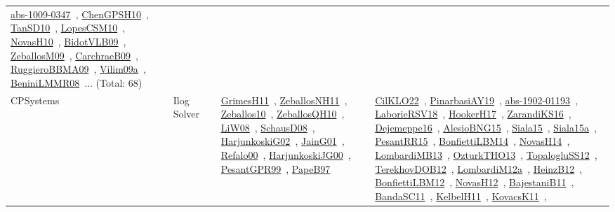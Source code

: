 {\begin{longtable}{lp{3cm}>{\raggedright\arraybackslash}p{6cm}>{\raggedright\arraybackslash}p{6cm}>{\raggedright\arraybackslash}p{8cm}}
\href{../works/abs-1009-0347.pdf}{abs-1009-0347}~\cite{abs-1009-0347}, \href{../works/ChenGPSH10.pdf}{ChenGPSH10}~\cite{ChenGPSH10}, \href{../works/TanSD10.pdf}{TanSD10}~\cite{TanSD10}, \href{../works/LopesCSM10.pdf}{LopesCSM10}~\cite{LopesCSM10}, \href{../works/NovasH10.pdf}{NovasH10}~\cite{NovasH10}, \href{../works/BidotVLB09.pdf}{BidotVLB09}~\cite{BidotVLB09}, \href{../works/ZeballosM09.pdf}{ZeballosM09}~\cite{ZeballosM09}, \href{../works/CarchraeB09.pdf}{CarchraeB09}~\cite{CarchraeB09}, \href{../works/RuggieroBBMA09.pdf}{RuggieroBBMA09}~\cite{RuggieroBBMA09}, \href{../works/Vilim09a.pdf}{Vilim09a}~\cite{Vilim09a}, \href{../works/BeniniLMMR08.pdf}{BeniniLMMR08}~\cite{BeniniLMMR08}... (Total: 68)\\
\index{Ilog Solver}\index{CPSystems!Ilog Solver}CPSystems & Ilog Solver &  & \href{../works/GrimesH11.pdf}{GrimesH11}~\cite{GrimesH11}, \href{../works/ZeballosNH11.pdf}{ZeballosNH11}~\cite{ZeballosNH11}, \href{../works/Zeballos10.pdf}{Zeballos10}~\cite{Zeballos10}, \href{../works/ZeballosQH10.pdf}{ZeballosQH10}~\cite{ZeballosQH10}, \href{../works/LiW08.pdf}{LiW08}~\cite{LiW08}, \href{../works/SchausD08.pdf}{SchausD08}~\cite{SchausD08}, \href{../works/HarjunkoskiG02.pdf}{HarjunkoskiG02}~\cite{HarjunkoskiG02}, \href{../works/JainG01.pdf}{JainG01}~\cite{JainG01}, \href{../works/Refalo00.pdf}{Refalo00}~\cite{Refalo00}, \href{../works/HarjunkoskiJG00.pdf}{HarjunkoskiJG00}~\cite{HarjunkoskiJG00}, \href{../works/PesantGPR99.pdf}{PesantGPR99}~\cite{PesantGPR99}, \href{../works/PapeB97.pdf}{PapeB97}~\cite{PapeB97} & \href{../works/CilKLO22.pdf}{CilKLO22}~\cite{CilKLO22}, \href{../works/PinarbasiAY19.pdf}{PinarbasiAY19}~\cite{PinarbasiAY19}, \href{../works/abs-1902-01193.pdf}{abs-1902-01193}~\cite{abs-1902-01193}, \href{../works/LaborieRSV18.pdf}{LaborieRSV18}~\cite{LaborieRSV18}, \href{../works/HookerH17.pdf}{HookerH17}~\cite{HookerH17}, \href{../works/ZarandiKS16.pdf}{ZarandiKS16}~\cite{ZarandiKS16}, \href{../works/Dejemeppe16.pdf}{Dejemeppe16}~\cite{Dejemeppe16}, \href{../works/AlesioBNG15.pdf}{AlesioBNG15}~\cite{AlesioBNG15}, \href{../works/Siala15.pdf}{Siala15}~\cite{Siala15}, \href{../works/Siala15a.pdf}{Siala15a}~\cite{Siala15a}, \href{../works/PesantRR15.pdf}{PesantRR15}~\cite{PesantRR15}, \href{../works/BonfiettiLBM14.pdf}{BonfiettiLBM14}~\cite{BonfiettiLBM14}, \href{../works/NovasH14.pdf}{NovasH14}~\cite{NovasH14}, \href{../works/LombardiMB13.pdf}{LombardiMB13}~\cite{LombardiMB13}, \href{../works/OzturkTHO13.pdf}{OzturkTHO13}~\cite{OzturkTHO13}, \href{../works/TopalogluSS12.pdf}{TopalogluSS12}~\cite{TopalogluSS12}, \href{../works/TerekhovDOB12.pdf}{TerekhovDOB12}~\cite{TerekhovDOB12}, \href{../works/LombardiM12a.pdf}{LombardiM12a}~\cite{LombardiM12a}, \href{../works/HeinzB12.pdf}{HeinzB12}~\cite{HeinzB12}, \href{../works/BonfiettiLBM12.pdf}{BonfiettiLBM12}~\cite{BonfiettiLBM12}, \href{../works/NovasH12.pdf}{NovasH12}~\cite{NovasH12}, \href{../works/BajestaniB11.pdf}{BajestaniB11}~\cite{BajestaniB11}, \href{../works/BandaSC11.pdf}{BandaSC11}~\cite{BandaSC11}, \href{../works/KelbelH11.pdf}{KelbelH11}~\cite{KelbelH11}, \href{../works/KovacsK11.pdf}{KovacsK11}~\cite{KovacsK11}, 
\end{longtable}}

